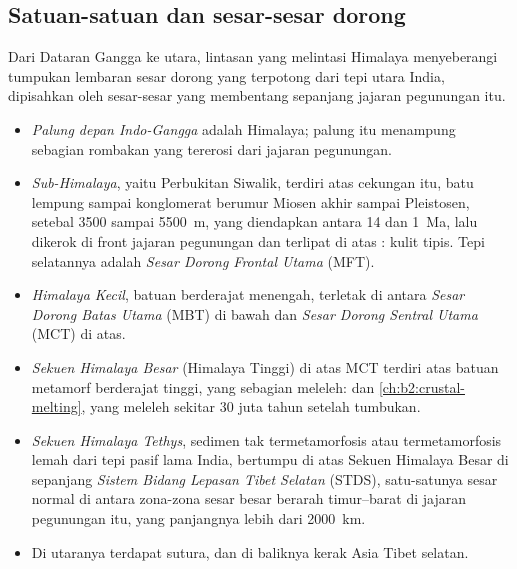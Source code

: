 \subsection{Satuan-satuan dan sesar-sesar dorong}

Dari Dataran Gangga ke utara, lintasan yang melintasi Himalaya menyeberangi tumpukan lembaran sesar dorong
yang terpotong dari tepi utara India, dipisahkan oleh sesar-sesar yang membentang sepanjang jajaran pegunungan itu.
\begin{itemize}
\item \emph{Palung depan Indo-Gangga} adalah  Himalaya; palung itu menampung sebagian
rombakan yang tererosi dari jajaran pegunungan.
\item \emph{Sub-Himalaya}, yaitu Perbukitan Siwalik, terdiri atas  cekungan itu,
batu lempung sampai konglomerat berumur Miosen akhir sampai Pleistosen, setebal 3500 sampai \qty{5500}{m},
yang diendapkan antara 14 dan \qty{1}{Ma}, lalu dikerok di front jajaran pegunungan dan terlipat di atas
:  kulit tipis. Tepi selatannya adalah \emph{Sesar Dorong
Frontal Utama} (MFT).
\item \emph{Himalaya Kecil}, batuan berderajat  menengah, terletak di antara
\emph{Sesar Dorong Batas Utama} (MBT) di bawah dan \emph{Sesar Dorong Sentral Utama} (MCT) di atas.
\item \emph{Sekuen Himalaya Besar} (Himalaya Tinggi) di atas MCT terdiri atas batuan
metamorf berderajat tinggi, yang sebagian meleleh:  dan 
\cref{ch:b2:crustal-melting}, yang meleleh sekitar 30 juta tahun setelah tumbukan.
\item \emph{Sekuen Himalaya Tethys}, sedimen tak termetamorfosis atau termetamorfosis lemah
dari tepi pasif lama India, bertumpu di atas Sekuen Himalaya Besar di sepanjang
\emph{Sistem Bidang Lepasan Tibet Selatan} (STDS), satu-satunya sesar normal di antara zona-zona sesar
besar berarah timur--barat di jajaran pegunungan itu, yang panjangnya lebih dari \qty{2000}{km}.
\item Di utaranya terdapat sutura, dan di baliknya kerak Asia Tibet selatan.
\end{itemize}

